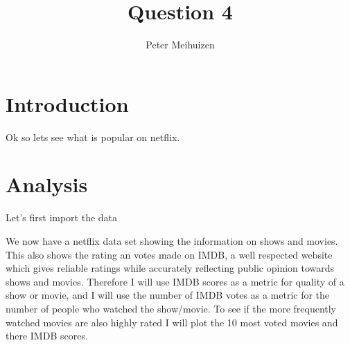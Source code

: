 \documentclass[11pt,preprint, authoryear]{elsarticle}
\numberwithin{equation}{section}
\numberwithin{figure}{section}
\numberwithin{table}{section}
\begin{document}
\begin{frontmatter}  %

\title{Question 4}





\author[Add1]{Peter Meihuizen}





\address[Add1]{Stellenbosch University}



\vspace{1cm}





\vspace{0.5cm}

\end{frontmatter}

\setcounter{footnote}{0}



\pagestyle{fancy}
\chead{}
\rhead{}
\lfoot{}
\lhead{}
\cfoot{}


\headsep 35pt %




\hypertarget{introduction}{%
\section{\texorpdfstring{Introduction
\label{Introduction}}{Introduction }}\label{introduction}}

Ok so lets see what is popular on netflix.

\hypertarget{analysis}{%
\section{\texorpdfstring{Analysis
\label{Analysis}}{Analysis }}\label{analysis}}

Let's first import the data

We now have a netflix data set showing the information on shows and
movies. This also shows the rating an votes made on IMDB, a well
respected website which gives reliable ratings while accurately
reflecting public opinion towards shows and movies. Therefore I will use
IMDB scores as a metric for quality of a show or movie, and I will use
the number of IMDB votes as a metric for the number of people who
watched the show/movie. To see if the more frequently watched movies are
also highly rated I will plot the 10 most voted movies and there IMDB
scores.
\end{document}
